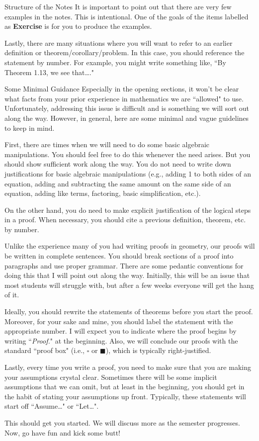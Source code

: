 \begin{section}{Structure of the Notes}
It is important to point out that there are very few examples in the notes.  This is intentional.  One of the goals of the items labelled as \textbf{Exercise} is for you to produce the examples.

Lastly, there are many situations where you will want to refer to an earlier definition or theorem/corollary/problem.  In this case, you should reference the statement by number.  For example, you might write something like, ``By Theorem 1.13, we see that\ldots."

\end{section}

\begin{section}{Some Minimal Guidance}
Especially in the opening sections, it won't be clear what facts from your prior experience in mathematics we are ``allowed" to use.  Unfortunately, addressing this issue is difficult and is something we will sort out along the way.  However, in general, here are some minimal and vague guidelines to keep in mind.  

First, there are times when we will need to do some basic algebraic manipulations.  You should feel free to do this whenever the need arises.  But you should show sufficient work along the way.  You do not need to write down justifications for basic algebraic manipulations (e.g., adding 1 to both sides of an equation, adding and subtracting the same amount on the same side of an equation, adding like terms, factoring, basic simplification, etc.).  

On the other hand, you do need to make explicit justification of the logical steps in a proof.  When necessary, you should cite a previous definition, theorem, etc. by number.

Unlike the experience many of you had writing proofs in geometry, our proofs will be written in complete sentences.  You should break sections of a proof into paragraphs and use proper grammar.  There are some pedantic conventions for doing this that I will point out along the way.  Initially, this will be an issue that most students will struggle with, but after a few weeks everyone will get the hang of it.

Ideally, you should rewrite the statements of theorems before you start the proof.  Moreover, for your sake and mine, you should label the statement with the appropriate number.  I will expect you to indicate where the proof begins by writing ``\emph{Proof.}" at the beginning.  Also, we will conclude our proofs with the standard ``proof box" (i.e., $\square$ or $\blacksquare$), which is typically right-justified.

Lastly, every time you write a proof, you need to make sure that you are making your assumptions crystal clear.  Sometimes there will be some implicit assumptions that we can omit, but at least in the beginning, you should get in the habit of stating your assumptions up front.  Typically, these statements will start off ``Assume\ldots" or ``Let\ldots".  

This should get you started.  We will discuss more as the semester progresses.  Now, go have fun and kick some butt!

\end{section}